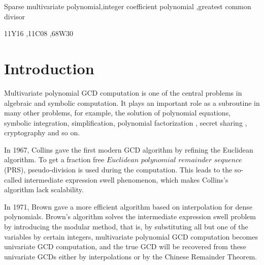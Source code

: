 \documentclass[final,20pt]{elsarticle}
\begin{document}
\begin{frontmatter}


\begin{keyword}
Sparse multivariate polynomial\sep integer coefficient polynomial \sep  greatest common divisor

\MSC 11Y16 \sep  11C08 \sep 68W30

\end{keyword}

\end{frontmatter}


\section{Introduction}
Multivariate polynomial GCD computation is one of the central problems in algebraic
and symbolic computation.
%
It plays an important role as a subroutine in many
other problems, for example, the solution of polynomial equations,
symbolic integration, simplification, polynomial factorization \cite{HuangG23,ChenM23,MonaganTuncerT20,MonaganPaluck22}, secret sharing \cite{CafaroP18,VijayakumarBK13}, cryptography \cite{CoppersmithFPR96} and so on.

In 1967, Collins \cite{Collins67} gave the first modern GCD algorithm by refining the Euclidean algorithm.
%
To get a fraction free $Euclidean$ $polynomial$ 
$remainder$ $sequence$ (PRS), pseudo-division is used during the computation. This leads to the so-called intermediate expression swell phenomenon, which makes Collins's algorithm lack scalability.

In 1971, Brown \cite{brown1971euclid} gave a more efficient  algorithm based on interpolation for dense polynomials.
%
Brown's algorithm solves the intermediate expression swell problem by introducing the modular method,
that is, by substituting all but one of the variables by certain integers,
multivariate polynomial GCD computation becomes univariate GCD computation,
and the true GCD will be recovered from these univariate GCDs either by
interpolations or by the Chinese Remainder Theorem.
%
\end{document}
